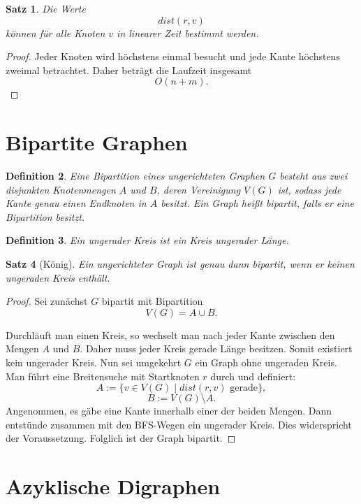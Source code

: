 \documentclass[12pt]{article}
\newtheorem{satz}{Satz}[section]
\newtheorem{definition}[satz]{Definition}
\begin{document}
\begin{satz}
Die Werte
\[
dist(r,v)
\]
können für alle Knoten \(v\) in linearer Zeit bestimmt werden.
\end{satz}

\begin{proof}
Jeder Knoten wird höchstens einmal besucht und jede Kante höchstens zweimal betrachtet. Daher beträgt die Laufzeit insgesamt
\[
O(n+m).
\]
\end{proof}

\section{Bipartite Graphen}

\begin{definition}
Eine Bipartition eines ungerichteten Graphen \(G\) besteht aus zwei disjunkten Knotenmengen \(A\) und \(B\), deren Vereinigung \(V(G)\) ist, sodass jede Kante genau einen Endknoten in \(A\) besitzt.
Ein Graph heißt bipartit, falls er eine Bipartition besitzt.
\end{definition}

\begin{definition}
Ein ungerader Kreis ist ein Kreis ungerader Länge.
\end{definition}

\begin{satz}[König]
Ein ungerichteter Graph ist genau dann bipartit, wenn er keinen ungeraden Kreis enthält.
\end{satz}

\begin{proof}
Sei zunächst \(G\) bipartit mit Bipartition
\[
V(G)=A\cup B.
\]

Durchläuft man einen Kreis, so wechselt man nach jeder Kante zwischen den Mengen \(A\) und \(B\). Daher muss jeder Kreis gerade Länge besitzen. Somit existiert kein ungerader Kreis.
Nun sei umgekehrt \(G\) ein Graph ohne ungeraden Kreis. Man führt eine Breitensuche mit Startknoten \(r\) durch und definiert:
\[
A:=\{v\in V(G)\mid dist(r,v)\text{ gerade}\},
\]
\[
B:=V(G)\setminus A.
\]
Angenommen, es gäbe eine Kante innerhalb einer der beiden Mengen. Dann entstünde zusammen mit den BFS-Wegen ein ungerader Kreis. Dies widerspricht der Voraussetzung.
Folglich ist der Graph bipartit.
\end{proof}

\section{Azyklische Digraphen}
\end{document}
